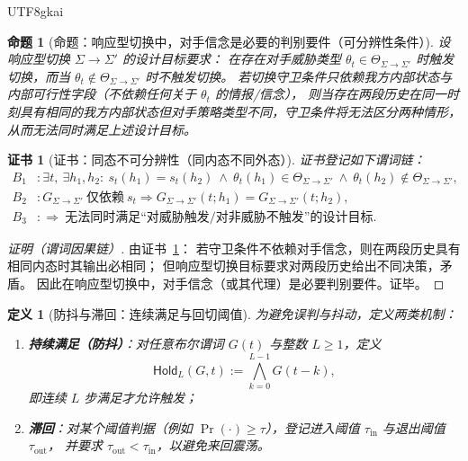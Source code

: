 \documentclass[12pt]{article}
\newtheorem{definition}{定义}[section]
\newtheorem{proposition}{命题}[section]
\newtheorem{Certificate}{证书}[section]
\begin{document}
\begin{CJK*}{UTF8}{gkai}
\begin{proposition}[命题：响应型切换中，对手信念是必要的判别要件（可分辨性条件）]
\label{prop:openra-opponent-belief-necessary}
设响应型切换 $\Sigma\to\Sigma'$ 的设计目标要求：
在存在对手威胁类型 $\theta_t\in\Theta_{\Sigma\to\Sigma'}$ 时触发切换，而当 $\theta_t\notin\Theta_{\Sigma\to\Sigma'}$ 时不触发切换。
若切换守卫条件只依赖我方内部状态与内部可行性字段（不依赖任何关于 $\theta_t$ 的情报/信念），
则当存在两段历史在同一时刻具有相同的我方内部状态但对手策略类型不同，守卫条件将无法区分两种情形，从而无法同时满足上述设计目标。
\end{proposition}

\begin{Certificate}[证书：同态不可分辨性（同内态不同外态）]
\label{cert:openra-opponent-belief-necessary}
证书登记如下谓词链：
\[
\begin{aligned}
  B_1 &: \exists t,\ \exists h_1,h_2:\ s_t(h_1)=s_t(h_2)\ \wedge\ \theta_t(h_1)\in\Theta_{\Sigma\to\Sigma'}\ \wedge\
    \theta_t(h_2)\notin\Theta_{\Sigma\to\Sigma'},\\
  B_2 &: G_{\Sigma\to\Sigma'}\ \text{仅依赖}\ s_t \Rightarrow G_{\Sigma\to\Sigma'}(t;h_1)=G_{\Sigma\to\Sigma'}(t;h_2),\\
  B_3 &: \Rightarrow\ \text{无法同时满足“对威胁触发/对非威胁不触发”的设计目标}.
\end{aligned}
\]
\end{Certificate}

\begin{proof}[证明（谓词因果链）]
由证书~\ref{cert:openra-opponent-belief-necessary}：
若守卫条件不依赖对手信念，则在两段历史具有相同内态时其输出必相同；
但响应型切换目标要求对两段历史给出不同决策，矛盾。
因此在响应型切换中，对手信念（或其代理）是必要判别要件。证毕。
\end{proof}

\begin{definition}[防抖与滞回：连续满足与回切阈值]
为避免误判与抖动，定义两类机制：
\begin{enumerate}
  \item \textbf{持续满足（防抖）}：对任意布尔谓词 $G(t)$ 与整数 $L\ge 1$，定义
  \[
    \mathsf{Hold}_{L}(G,t):=\bigwedge_{k=0}^{L-1} G(t-k),
  \]
  即连续 $L$ 步满足才允许触发；
  \item \textbf{滞回}：对某个阈值判据（例如 $\Pr(\cdot)\ge\tau$），登记进入阈值 $\tau_{\mathrm{in}}$ 与退出阈值 $\tau_{\mathrm{out}}$，
  并要求 $\tau_{\mathrm{out}}<\tau_{\mathrm{in}}$，以避免来回震荡。
\end{enumerate}
\end{definition}


\end{CJK*}
\end{document}
